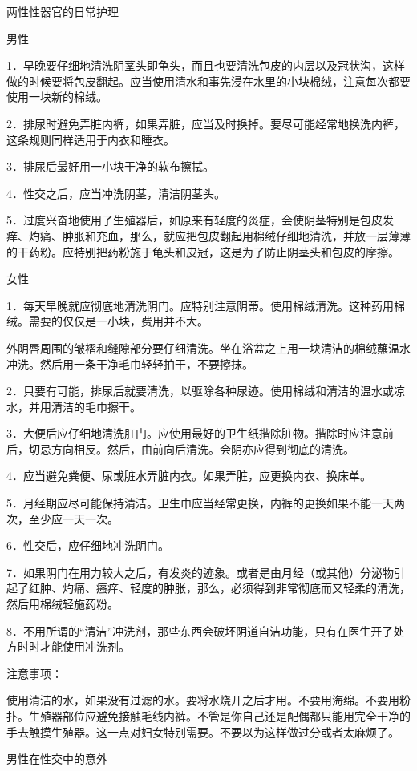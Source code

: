 \documentclass[12pt,UTF8,openany]{ctexbook}
\begin{document}
两性性器官的日常护理


男性

1．早晚要仔细地清洗阴茎头即龟头，而且也要清洗包皮的内层以及冠状沟，这样做的时候要将包皮翻起。应当使用清水和事先浸在水里的小块棉绒，注意每次都要使用一块新的棉绒。

2．排尿时避免弄脏内裤，如果弄脏，应当及时换掉。要尽可能经常地换洗内裤，这条规则同样适用于内衣和睡衣。

3．排尿后最好用一小块干净的软布擦拭。

4．性交之后，应当冲洗阴茎，清洁阴茎头。

5．过度兴奋地使用了生殖器后，如原来有轻度的炎症，会使阴茎特别是包皮发痒、灼痛、肿胀和充血，那么，就应把包皮翻起用棉绒仔细地清洗，并放一层薄薄的干药粉。应特别把药粉施于龟头和皮冠，这是为了防止阴茎头和包皮的摩擦。

女性

1．每天早晚就应彻底地清洗阴门。应特别注意阴蒂。使用棉绒清洗。这种药用棉绒。需要的仅仅是一小块，费用并不大。

外阴唇周围的皱褶和缝隙部分要仔细清洗。坐在浴盆之上用一块清洁的棉绒蘸温水冲洗。然后用一条干净毛巾轻轻拍干，不要擦抹。

2．只要有可能，排尿后就要清洗，以驱除各种尿迹。使用棉绒和清洁的温水或凉水，并用清洁的毛巾擦干。

3．大便后应仔细地清洗肛门。应使用最好的卫生纸揩除脏物。揩除时应注意前后，切忌方向相反。然后，由前向后清洗。会阴亦应得到彻底的清洗。

4．应当避免粪便、尿或脏水弄脏内衣。如果弄脏，应更换内衣、换床单。

5．月经期应尽可能保持清洁。卫生巾应当经常更换，内裤的更换如果不能一天两次，至少应一天一次。

6．性交后，应仔细地冲洗阴门。

7．如果阴门在用力较大之后，有发炎的迹象。或者是由月经（或其他）分泌物引起了红肿、灼痛、瘙痒、轻度的肿胀，那么，必须得到非常彻底而又轻柔的清洗，然后用棉绒轻施药粉。

8．不用所谓的“清洁”冲洗剂，那些东西会破坏阴道自洁功能，只有在医生开了处方时时才能使用冲洗剂。

注意事项：

使用清洁的水，如果没有过滤的水。要将水烧开之后才用。不要用海绵。不要用粉扑。生殖器部位应避免接触毛线内裤。不管是你自己还是配偶都只能用完全干净的手去触摸生殖器。这一点对妇女特别需要。不要以为这样做过分或者太麻烦了。





男性在性交中的意外
\end{document}
